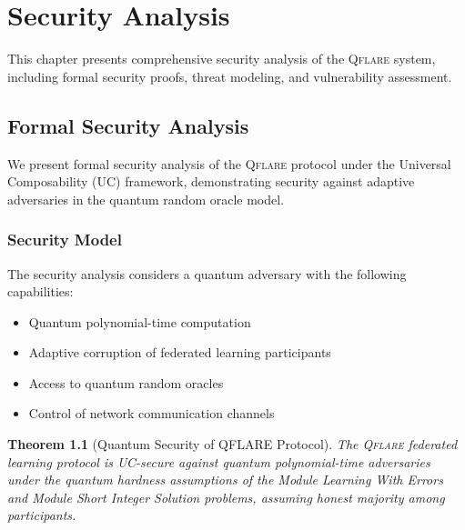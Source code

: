 \documentclass[12pt,a4paper,twoside]{book}
\newcommand{\qflare}{\textsc{Qflare}}
\newtheorem{theorem}{Theorem}[chapter]
\begin{document}
\chapter{Security Analysis}
\label{ch:security-analysis}

This chapter presents comprehensive security analysis of the \qflare{} system, including formal security proofs, threat modeling, and vulnerability assessment.

\section{Formal Security Analysis}
\label{sec:formal-security}

We present formal security analysis of the \qflare{} protocol under the Universal Composability (UC) framework, demonstrating security against adaptive adversaries in the quantum random oracle model.

\subsection{Security Model}
\label{subsec:security-model}

The security analysis considers a quantum adversary with the following capabilities:

\begin{itemize}
\item Quantum polynomial-time computation
\item Adaptive corruption of federated learning participants
\item Access to quantum random oracles
\item Control of network communication channels
\end{itemize}

\begin{theorem}[Quantum Security of QFLARE Protocol]
\label{thm:qflare-security}
The \qflare{} federated learning protocol is UC-secure against quantum polynomial-time adversaries under the quantum hardness assumptions of the Module Learning With Errors and Module Short Integer Solution problems, assuming honest majority among participants.
\end{theorem}
\end{document}
